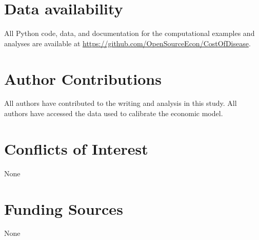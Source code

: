 \documentclass[letterpaper,12pt]{article}
\theoremstyle{definition}
\begin{document}
\section*{Data availability}
All Python code, data, and documentation for the computational examples and analyses are available at \href{https://github.com/OpenSourceEcon/CostOfDisease}{https://github.com/OpenSourceEcon/CostOfDisease}.

\section*{Author Contributions}
All authors have contributed to the writing and analysis in this study.  All authors have accessed the data used to calibrate the economic model.

\section*{Conflicts of Interest}
None

\section*{Funding Sources}
None



\end{document}
